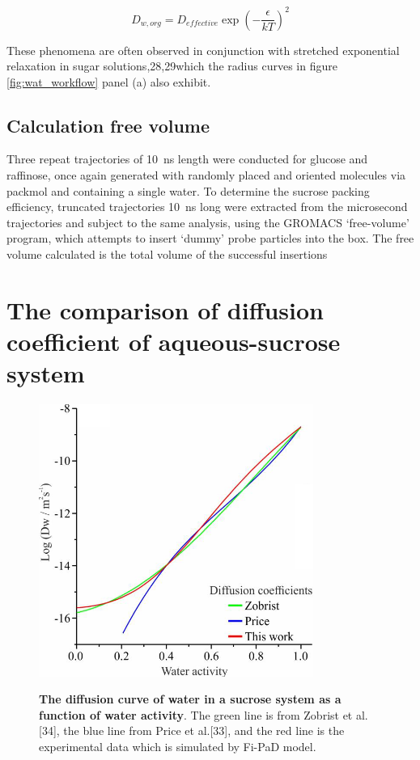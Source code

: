 \begin{equation}
D_{w, org}=D_{effective} \exp \left(-\frac{\epsilon}{k T}\right)^{2}
\end{equation}

These  phenomena  are  often  observed  in  conjunction  with stretched  exponential  relaxation  in  sugar solutions,28,29which the radius curves in figure \ref{fig:wat_workflow} panel (a) also exhibit. 

\subsection{Calculation free volume}
Three repeat trajectories of \SI{10}{\nano\second} length were conducted for glucose and raffinose, once again generated with randomly placed and oriented molecules via packmol and containing a single water. To determine the sucrose packing efficiency, truncated trajectories \SI{10}{\nano\second} long were extracted from the microsecond trajectories and subject to the same analysis, using the GROMACS `free-volume’ program, which attempts to insert `dummy’ probe particles into the box. The free volume calculated is the total volume of the successful insertions

\section{The comparison of diffusion coefficient of aqueous-sucrose system}

\begin{figure}
    \centering
    \caption{\textbf{The diffusion curve of water in a sucrose system as a function of water activity}. The green line is from Zobrist et al.[34], the blue line from Price et al.[33], and the red line is the experimental data which is simulated by Fi-PaD model.}
    \includegraphics[width=0.8\textwidth]{chapters/water_hopping/figures/image058.png}
    \label{fig:wat_s11}
\end{figure}


